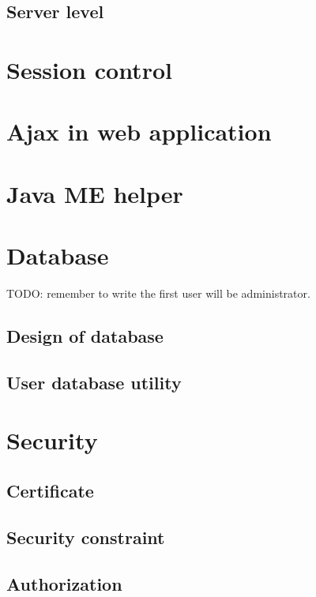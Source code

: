 \subsection{Server level}
\label{sec:WebApplication:ValidationMechanism:ServerLevel}

\section{Session control}
\label{sec:WebApplication:SessionControl}

\section{Ajax in web application}
\label{sec:WebApplication:AjaxInWebApplication}

\section{Java ME helper}
\label{sec:WebApplication:JavaMEHelper}

\section{Database}
\label{sec:WebApplication:Database}

\textsf{TODO: remember to write the first user will be administrator.}


\subsection{Design of database}
\label{sec:WebApplication:Database:DesignOfDatabase}

\subsection{User database utility}
\label{sec:WebApplication:Database:UserDatabaseUtility}

\section{Security}
\label{sec:WebApplication:Security}

\subsection{Certificate}
\label{sec:WebApplication:Security:Certificate}

\subsection{Security constraint}
\label{sec:WebApplication:Security:SecurityConstraint}

\subsection{Authorization}
\label{sec:WebApplication:Authorization}

